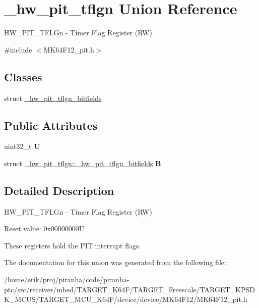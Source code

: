 \hypertarget{union__hw__pit__tflgn}{}\section{\+\_\+hw\+\_\+pit\+\_\+tflgn Union Reference}
\label{union__hw__pit__tflgn}


H\+W\+\_\+\+P\+I\+T\+\_\+\+T\+F\+L\+Gn -\/ Timer Flag Register (RW)  




{\ttfamily \#include $<$M\+K64\+F12\+\_\+pit.\+h$>$}

\subsection*{Classes}
\begin{DoxyCompactItemize}
\item 
struct \hyperlink{struct__hw__pit__tflgn_1_1__hw__pit__tflgn__bitfields}{\+\_\+hw\+\_\+pit\+\_\+tflgn\+\_\+bitfields}
\end{DoxyCompactItemize}
\subsection*{Public Attributes}
\begin{DoxyCompactItemize}
\item 
uint32\+\_\+t {\bfseries U}\hypertarget{union__hw__pit__tflgn_aa4dda12a596b687192a7418d2bbc047f}{}\label{union__hw__pit__tflgn_aa4dda12a596b687192a7418d2bbc047f}

\item 
struct \hyperlink{struct__hw__pit__tflgn_1_1__hw__pit__tflgn__bitfields}{\+\_\+hw\+\_\+pit\+\_\+tflgn\+::\+\_\+hw\+\_\+pit\+\_\+tflgn\+\_\+bitfields} {\bfseries B}\hypertarget{union__hw__pit__tflgn_a85e70527d8c5fe533acab85be531bfd5}{}\label{union__hw__pit__tflgn_a85e70527d8c5fe533acab85be531bfd5}

\end{DoxyCompactItemize}


\subsection{Detailed Description}
H\+W\+\_\+\+P\+I\+T\+\_\+\+T\+F\+L\+Gn -\/ Timer Flag Register (RW) 

Reset value\+: 0x00000000U

These registers hold the P\+IT interrupt flags. 

The documentation for this union was generated from the following file\+:\begin{DoxyCompactItemize}
\item 
/home/erik/proj/piranha/code/piranha-\/ptc/src/receiver/mbed/\+T\+A\+R\+G\+E\+T\+\_\+\+K64\+F/\+T\+A\+R\+G\+E\+T\+\_\+\+Freescale/\+T\+A\+R\+G\+E\+T\+\_\+\+K\+P\+S\+D\+K\+\_\+\+M\+C\+U\+S/\+T\+A\+R\+G\+E\+T\+\_\+\+M\+C\+U\+\_\+\+K64\+F/device/device/\+M\+K64\+F12/M\+K64\+F12\+\_\+pit.\+h\end{DoxyCompactItemize}
